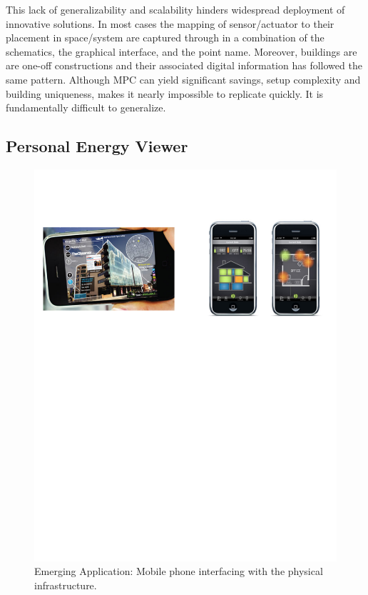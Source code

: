This lack of generalizability and scalability hinders widespread deployment of innovative solutions.  In most cases the 
mapping of sensor/actuator to their placement in space/system are 
captured through in a combination of the schematics, the graphical interface, and the point name. Moreover, buildings are 
are one-off constructions and their associated digital information has followed the same pattern.  Although MPC can yield significant savings, setup complexity and building uniqueness, makes it nearly impossible to replicate quickly.  It is fundamentally difficult to generalize. 


\subsection{Personal Energy Viewer}
\label{sec:mobile}

\begin{figure}[h!] %
\centering
\includegraphics[width=0.75\columnwidth]{figs/mobileEnergy1}
\caption{Emerging Application: Mobile phone interfacing with the physical infrastructure.}
\label{fig:mobileEnergy1}
\end{figure}

